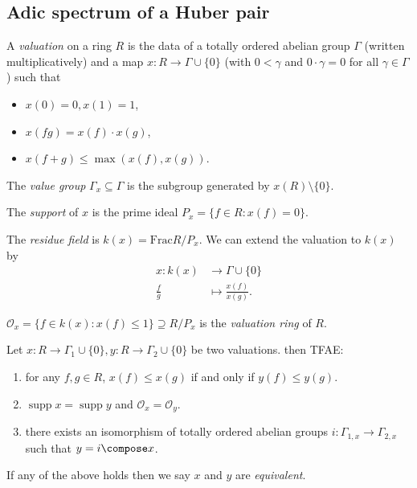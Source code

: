 \documentclass[a4paper]{article}
\renewcommand*{\O}{\mathcal{O}}
\DeclareMathOperator{\supp}{supp} %
\begin{document}
\subsection{Adic spectrum of a Huber pair}

\begin{definition}[valuation]
  A \emph{valuation} on a ring \(R\) is the data of a totally ordered abelian group \(\Gamma\) (written multiplicatively) and a map \(x: R \to \Gamma \cup \{0\}\) (with \(0 < \gamma\) and \(0 \cdot \gamma = 0\) for all \(\gamma \in \Gamma\)) such that
  \begin{itemize}
  \item \(x(0) = 0, x(1) = 1\),
  \item \(x(fg) = x(f) \cdot x(g)\),
  \item \(x(f + g) \leq \max(x(f), x(g))\).
  \end{itemize}

  The \emph{value group} \(\Gamma_x \subseteq \Gamma\) is the subgroup generated by \(x(R) \setminus \{0\}\).

  The \emph{support} of \(x\) is the prime ideal \(P_x = \{f \in R: x(f) = 0\}\).

  The \emph{residue field} is \(k(x) = \mathrm{Frac} R/P_x\). We can extend the valuation to \(k(x)\) by
  \begin{align*}
    x: k(x) &\to \Gamma \cup \{0\} \\
    \frac{f}{g} &\mapsto \frac{x(f)}{x(g)}.
  \end{align*}

  \(\O_x = \{f \in k(x): x(f) \leq 1\} \supseteq R/P_x\) is the \emph{valuation ring} of \(R\).
\end{definition}

\begin{lemma}
  Let \(x: R \to \Gamma_1 \cup \{0\}, y: R \to \Gamma_2 \cup \{0\}\) be two valuations. then TFAE:
  \begin{enumerate}
  \item for any \(f, g \in R\), \(x(f) \leq x(g)\) if and only if \(y(f) \leq y(g)\).
  \item \(\supp x = \supp y\) and \(\O_x = \O_y\).
  \item there exists an isomorphism of totally ordered abelian groups \(i: \Gamma_{1, x} \to \Gamma_{2, x}\) such that \(y = i \compose x\).
  \end{enumerate}
  If any of the above holds then we say \(x\) and \(y\) are \emph{equivalent}.
\end{lemma}
\end{document}
